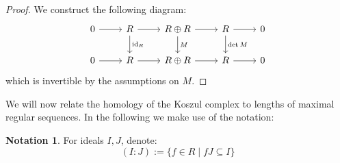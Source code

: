 \documentclass[12pt]{article}
\theoremstyle{plain}
\theoremstyle{definition}
\newtheorem{notation}[thm]{Notation}
\begin{document}
\begin{proof}
We construct the following diagram:
\begin{equation}
\begin{tikzcd}
0\arrow[r] & R\arrow[r]\arrow[d,"{\operatorname{id}_R}"] & R \oplus R\arrow[r]\arrow[d,"{M}"] & R\arrow[d,"{\operatorname{det}M}"]\arrow[r] & 0\\
0\arrow[r] & R\arrow[r] & R \oplus R\arrow[r] & R\arrow[r] & 0
\end{tikzcd}
\end{equation}
which is invertible by the assumptions on $M$.
\end{proof}
We will now relate the homology of the Koszul complex to lengths of maximal regular sequences. In the following we make use of the notation:
\begin{notation}
For ideals $I,J$, denote:
\begin{equation}
(I:J) := \lbrace f \in R \mid fJ \subseteq I\rbrace
\end{equation}
\end{notation}
\end{document}
